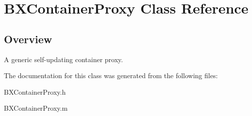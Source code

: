 \hypertarget{interface_b_x_container_proxy}{}\section{B\+X\+Container\+Proxy Class Reference}
\label{interface_b_x_container_proxy}


\subsection{Overview}
A generic self-\/updating container proxy. 

The documentation for this class was generated from the following files\+:\begin{DoxyCompactItemize}
\item 
B\+X\+Container\+Proxy.\+h\item 
B\+X\+Container\+Proxy.\+m\end{DoxyCompactItemize}
